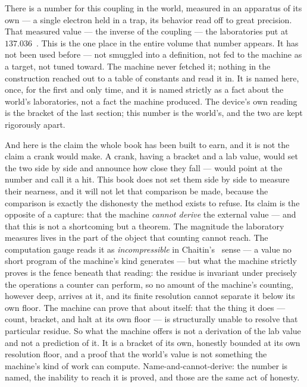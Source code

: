 There is a number for this coupling in the world, measured in an apparatus of its own --- a single electron held in a
trap, its behavior read off to great precision. That measured value --- the inverse of the coupling --- the laboratories
put at $137.036$~\cite{hanneke2008}. This is the one place in the entire volume that number appears. It has not been used
before --- not smuggled into a definition, not fed to the machine as a target, not tuned toward. The machine never
fetched it; nothing in the construction reached out to a table of constants and read it in. It is named here, once, for
the first and only time, and it is named strictly as a fact about the world's laboratories, not a fact the machine
produced. The device's own reading is the bracket of the last section; this number is the world's, and the two are kept
rigorously apart.

And here is the claim the whole book has been built to earn, and it is not the claim a crank would make. A crank, having a
bracket and a lab value, would set the two side by side and announce how close they fall --- would point at the number and
call it a hit. This book does not set them side by side to measure their nearness, and it will not let that comparison be
made, because the comparison is exactly the dishonesty the method exists to refuse. Its claim is the opposite of a
capture: that the machine \emph{cannot derive} the external value --- and that this is not a shortcoming but a theorem.
The magnitude the laboratory measures lives in the part of the object that counting cannot reach. The computation gauge reads it as
\emph{incompressible} in Chaitin's~\cite{chaitin1974} sense --- a value no short program of the machine's kind
generates --- but what the machine strictly proves is the fence beneath that reading: the residue is invariant under precisely the operations a counter can perform, so no amount of the machine's
counting, however deep, arrives at it, and its finite resolution cannot separate it below its own floor. The machine can prove that about itself: that the thing it does --- count,
bracket, and halt at its own floor --- is structurally unable to resolve that particular residue. So what the machine
offers is not a derivation of the lab value and not a prediction of it. It is a bracket of its own, honestly bounded at
its own resolution floor, and a proof that the world's value is not something the machine's kind of work can compute.
Name-and-cannot-derive: the number is named, the inability to reach it is proved, and those are the same act of honesty.

